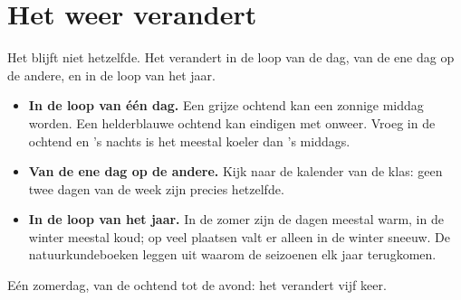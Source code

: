 \section{Het weer verandert}

Het  blijft niet hetzelfde. Het verandert in de loop van de dag, van
de ene dag op de andere, en in de loop van het jaar.

\begin{itemize}
  \item \textbf{In de loop van één dag.} Een grijze ochtend kan een zonnige
        middag worden. Een helderblauwe ochtend kan eindigen met onweer.
        Vroeg in de ochtend en 's nachts is het meestal koeler dan 's
        middags.
  \item \textbf{Van de ene dag op de andere.} Kijk naar de kalender van de
        klas: geen twee dagen van de week zijn precies hetzelfde.
  \item \textbf{In de loop van het jaar.} In de zomer zijn de dagen meestal
        warm, in de winter meestal koud; op veel plaatsen valt er alleen in
        de winter sneeuw. De natuurkundeboeken leggen uit waarom de
        seizoenen elk jaar terugkomen.
\end{itemize}

\begin{omfigure}

{\small Eén zomerdag, van de ochtend tot de avond: het  verandert vijf
keer.}
\label{fig:g1:watching-the-weather:day}
\end{omfigure}

